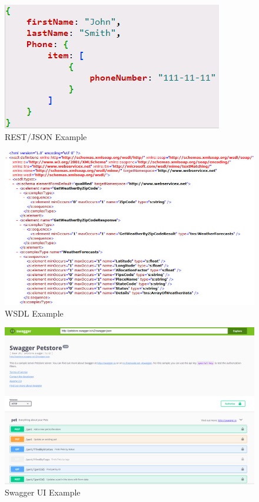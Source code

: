 \begin{figure}[!ht]
  \centering\includegraphics[width=\columnwidth]{images/json-rest-example.png}
  \caption{REST/JSON Example}\label{f:rest-example}
\end{figure}

\begin{figure}[!ht]
  \centering\includegraphics[width=\columnwidth]{images/wsdl-example.jpg}
  \caption{WSDL Example}\label{f:wsdl-example}
\end{figure}

\begin{figure}[!ht]
  \centering\includegraphics[width=\columnwidth]{images/swaggerui.png}
  \caption{Swagger UI Example}\label{f:swaggerui-example}
\end{figure}

